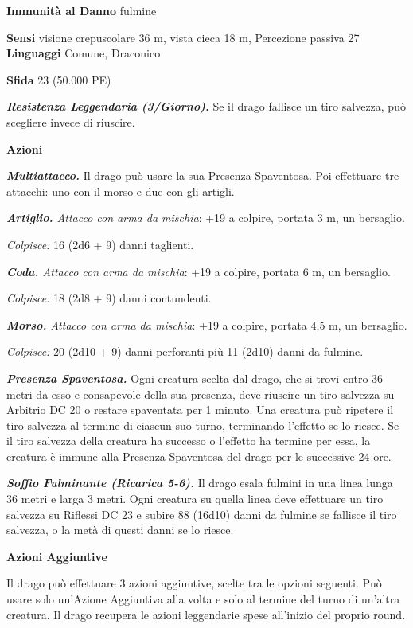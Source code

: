 \begin{multicols}{2}
\textbf{Immunità al Danno} fulmine

\textbf{Sensi} visione crepuscolare 36 m, vista cieca 18 m, Percezione passiva
27 \textbf{Linguaggi} Comune, Draconico

\textbf{Sfida} 23 (50.000 PE)\smallskip

\emph{\textbf{Resistenza Leggendaria (3/Giorno).}} Se il drago fallisce
un tiro salvezza, può scegliere invece di riuscire.

\smallskip\textbf{Azioni}

\emph{\textbf{Multiattacco.}} Il drago può usare la sua Presenza
Spaventosa. Poi effettuare tre attacchi: uno con il morso e due con gli
artigli.

\emph{\textbf{Artiglio.} Attacco con arma da mischia}: +19 a colpire,
portata 3 m, un bersaglio.

\emph{Colpisce:} 16 (2d6 + 9) danni taglienti.

\emph{\textbf{Coda.} Attacco con arma da mischia}: +19 a colpire,
portata 6 m, un bersaglio.

\emph{Colpisce:} 18 (2d8 + 9) danni contundenti.

\emph{\textbf{Morso.} Attacco con arma da mischia}: +19 a colpire,
portata 4,5 m, un bersaglio.

\emph{Colpisce:} 20 (2d10 + 9) danni perforanti più 11 (2d10) danni da
fulmine.

\emph{\textbf{Presenza Spaventosa.}} Ogni creatura scelta dal drago, che
si trovi entro 36 metri da esso e consapevole della sua presenza, deve
riuscire un tiro salvezza su Arbitrio DC 20 o restare spaventata per 1
minuto. Una creatura può ripetere il tiro salvezza al termine di ciascun
suo turno, terminando l'effetto se lo riesce. Se il tiro salvezza della
creatura ha successo o l'effetto ha termine per essa, la creatura è
immune alla Presenza Spaventosa del drago per le successive 24 ore.

\emph{\textbf{Soffio Fulminante (Ricarica 5-6).}} Il drago esala fulmini
in una linea lunga 36 metri e larga 3 metri. Ogni creatura su quella
linea deve effettuare un tiro salvezza su Riflessi DC 23 e subire 88
(16d10) danni da fulmine se fallisce il tiro salvezza, o la metà di
questi danni se lo riesce.

\textbf{Azioni Aggiuntive}

Il drago può effettuare 3 azioni aggiuntive, scelte tra le opzioni
seguenti. Può usare solo un'Azione Aggiuntiva alla volta e solo al
termine del turno di un'altra creatura. Il drago recupera le azioni
leggendarie spese all'inizio del proprio round.


\end{multicols}
